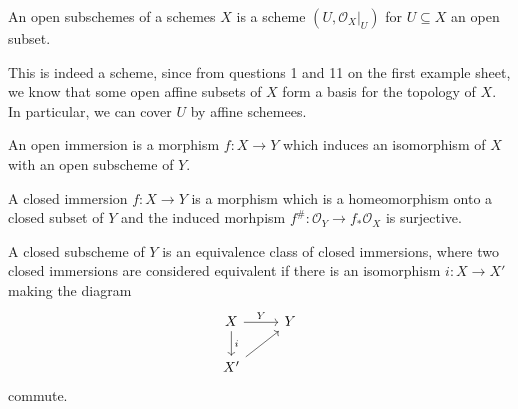 An open subschemes of a schemes $X$ is a scheme $(U, \mathcal{O}_X|_U)$ for $U \subseteq X$ an open subset.

This is indeed a scheme, since from questions 1 and 11 on the first example sheet, we know
that some open affine subsets of $X$ form a basis for the topology of $X$. In particular, we
can cover $U$ by affine schemees.

An open immersion is a morphism $f\colon X\to Y$ which induces an isomorphism of $X$ with an open
subscheme of $Y$.

A closed immersion $f\colon X\to Y$ is a morphism which is a homeomorphism onto a closed
subset of $Y$ and the induced morhpism $f^\#\colon \mathcal{O}_Y\to f_*\mathcal{O}_X$ is
surjective.

A closed subscheme of $Y$ is an equivalence class of closed immersions, where two closed
immersions are considered equivalent if there is an isomorphism $i\colon X\to X'$ making the diagram
\[\begin{tikzcd}
	X\ar[d, "i"]\ar[r, "Y"] & Y\\
	X'\ar[ur]
\end{tikzcd}\]
commute.
